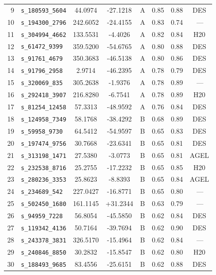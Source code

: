 \begin{longtable}{rlcccccc}
9 & \texttt{s\_180593\_5604} & 44.0974 & -27.1218 & A & 0.85 & 0.88 & DES \\
10 & \texttt{s\_194300\_2796} & 242.6052 & -24.4155 & A & 0.83 & 0.74 & \,--- \\
11 & \texttt{s\_304994\_4662} & 133.5531 & -4.4026 & A & 0.82 & 0.84 & H20 \\
12 & \texttt{s\_61472\_9399} & 359.5200 & -54.6765 & A & 0.80 & 0.88 & DES \\
13 & \texttt{s\_91761\_4679} & 350.3683 & -46.5138 & A & 0.80 & 0.86 & DES \\
14 & \texttt{s\_91796\_2958} & 2.9714 & -46.2395 & A & 0.78 & 0.79 & DES \\
15 & \texttt{s\_320069\_835} & 305.2638 & -1.9376 & A & 0.78 & 0.89 & \,--- \\
16 & \texttt{s\_292418\_3907} & 216.8280 & -6.7541 & A & 0.78 & 0.89 & H20 \\
17 & \texttt{s\_81254\_12458} & 57.3313 & -48.9592 & A & 0.76 & 0.84 & DES \\
18 & \texttt{s\_124958\_7349} & 58.1768 & -38.4292 & B & 0.68 & 0.89 & DES \\
19 & \texttt{s\_59958\_9730} & 64.5412 & -54.9597 & B & 0.65 & 0.83 & DES \\
20 & \texttt{s\_197474\_9756} & 30.7668 & -23.6341 & B & 0.65 & 0.81 & DES \\
21 & \texttt{s\_313198\_1471} & 27.5380 & -3.0773 & B & 0.65 & 0.81 & AGEL \\
22 & \texttt{s\_232538\_8716} & 25.2755 & -17.2232 & B & 0.65 & 0.85 & H20 \\
23 & \texttt{s\_280236\_3353} & 25.8623 & -8.8393 & B & 0.65 & 0.84 & AGEL \\
24 & \texttt{s\_234689\_542} & 227.0427 & -16.8771 & B & 0.65 & 0.80 & \,--- \\
25 & \texttt{s\_502450\_1680} & 161.1145 & +31.2344 & B & 0.63 & 0.79 & \,--- \\
26 & \texttt{s\_94959\_7228} & 56.8054 & -45.5850 & B & 0.62 & 0.84 & DES \\
27 & \texttt{s\_119342\_4136} & 50.7164 & -39.7694 & B & 0.62 & 0.90 & DES \\
28 & \texttt{s\_243378\_3831} & 326.5170 & -15.4964 & B & 0.62 & 0.84 & \,--- \\
29 & \texttt{s\_240846\_8850} & 30.2832 & -15.8547 & B & 0.62 & 0.80 & H20 \\
30 & \texttt{s\_188493\_9685} & 83.4556 & -25.6151 & B & 0.62 & 0.88 & DES \\

\end{longtable}
